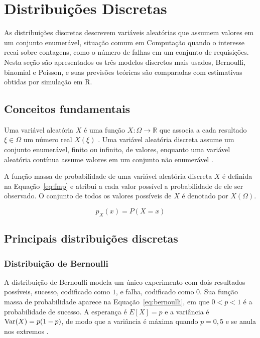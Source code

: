 \section{Distribuições Discretas}

As distribuições discretas descrevem variáveis aleatórias que assumem valores em um
conjunto enumerável, situação comum em Computação quando o interesse recai sobre
contagens, como o número de falhas em um conjunto de requisições. Nesta seção são
apresentados os três modelos discretos mais usados, Bernoulli, binomial e Poisson,
e suas previsões teóricas são comparadas com estimativas obtidas por simulação em R.

\subsection{Conceitos fundamentais}

Uma variável aleatória $X$ é uma função $X \colon \Omega \to \mathbb{R}$ que associa
a cada resultado $\xi \in \Omega$ um número real $X(\xi)$ \cite{chan2021probability}.
Uma variável aleatória discreta assume um conjunto enumerável, finito ou infinito,
de valores, enquanto uma variável aleatória contínua assume valores em um conjunto
não enumerável \cite{harcholbalter2024probability}.

A função massa de probabilidade de uma variável aleatória discreta $X$ é definida na
Equação~\ref{eq:fmp} e atribui a cada valor possível a probabilidade de ele ser
observado. O conjunto de todos os valores possíveis de $X$ é denotado por
$X(\Omega)$.

\begin{equation}
	p_X(x) = P(X = x)
	\label{eq:fmp}
\end{equation}

\subsection{Principais distribuições discretas}

\subsubsection{Distribuição de Bernoulli}

A distribuição de Bernoulli modela um único experimento com dois resultados
possíveis, sucesso, codificado como $1$, e falha, codificado como $0$. Sua função
massa de probabilidade aparece na Equação~\ref{eq:bernoulli}, em que $0 < p < 1$ é a
probabilidade de sucesso. A esperança é $E[X] = p$ e a variância é
$\operatorname{Var}(X) = p(1-p)$, de modo que a variância é máxima quando $p = 0{,}5$ e se anula
nos extremos \cite{sahu2024probability}.

